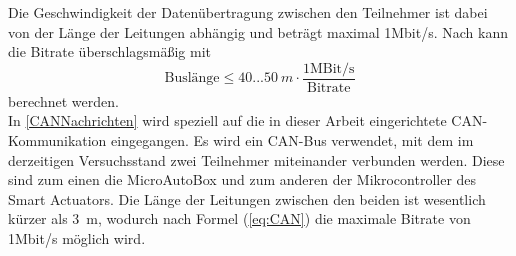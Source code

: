 Die Geschwindigkeit der Datenübertragung zwischen den Teilnehmer ist dabei von der Länge der Leitungen abhängig und beträgt maximal 1Mbit/s. Nach \cite[S.58]{Werner2014} kann die Bitrate überschlagsmäßig mit 
\begin{equation}
	\text{Buslänge}\leq 40...\SI{50}{m}\cdot \frac{1\text{MBit/s}}{\text{Bitrate}}
	\label{eq:CAN}
\end{equation}
berechnet werden.\\
In \autoref{CANNachrichten} wird speziell auf die in dieser Arbeit eingerichtete CAN-Kommunikation eingegangen. Es wird ein CAN-Bus verwendet, mit dem im derzeitigen Versuchsstand zwei Teilnehmer miteinander verbunden werden. Diese sind zum einen die MicroAutoBox und zum anderen der Mikrocontroller des Smart Actuators. Die Länge der Leitungen zwischen den beiden ist wesentlich kürzer als \SI{3}{m}, wodurch nach Formel (\ref{eq:CAN}) die maximale Bitrate von 1Mbit/s möglich wird.

